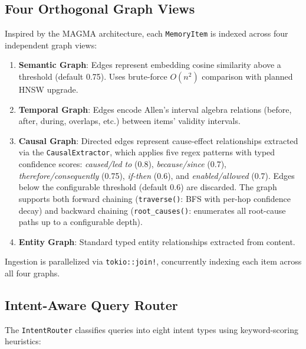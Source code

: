 \documentclass[11pt,a4paper,twocolumn]{article}
\begin{document}
\subsection{Four Orthogonal Graph Views}

Inspired by the MAGMA architecture, each \texttt{MemoryItem} is
indexed across four independent graph views:

\begin{enumerate}[leftmargin=*]
  \item \textbf{Semantic Graph}: Edges represent embedding cosine
    similarity above a threshold (default 0.75). Uses brute-force
    $O(n^2)$ comparison with planned HNSW upgrade.
  \item \textbf{Temporal Graph}: Edges encode Allen's interval algebra
    relations (before, after, during, overlaps, etc.) between items'
    validity intervals.
  \item \textbf{Causal Graph}: Directed edges represent cause-effect
    relationships extracted via the \texttt{CausalExtractor}, which
    applies five regex patterns with typed confidence scores:
    \emph{caused/led to} (0.8), \emph{because/since} (0.7),
    \emph{therefore/consequently} (0.75), \emph{if-then} (0.6),
    and \emph{enabled/allowed} (0.7). Edges below the configurable
    threshold (default 0.6) are discarded. The graph supports both
    forward chaining (\texttt{traverse()}: BFS with per-hop
    confidence decay) and backward chaining (\texttt{root\_causes()}:
    enumerates all root-cause paths up to a configurable depth).
  \item \textbf{Entity Graph}: Standard typed entity relationships
    extracted from content.
\end{enumerate}

Ingestion is parallelized via \texttt{tokio::join!}, concurrently
indexing each item across all four graphs.

\subsection{Intent-Aware Query Router}

The \texttt{IntentRouter} classifies queries into eight intent types
using keyword-scoring heuristics:
\end{document}
